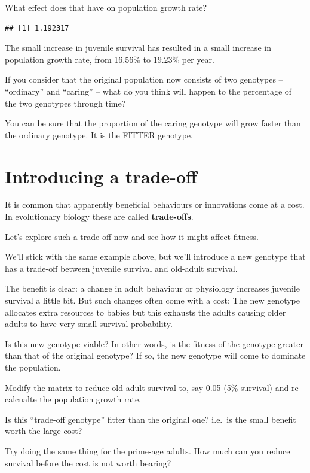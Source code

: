 \documentclass[
  a4paper]{book}
\newenvironment{Shaded}{\begin{snugshade}}{\end{snugshade}}
\newcommand{\FunctionTok}[1]{\textcolor[rgb]{0.00,0.00,0.00}{#1}}
\newcommand{\NormalTok}[1]{#1}
\newcommand{\SpecialCharTok}[1]{\textcolor[rgb]{0.00,0.00,0.00}{#1}}
\begin{document}
What effect does that have on population growth rate?

\begin{Shaded}
\end{Shaded}

\begin{verbatim}
## [1] 1.192317
\end{verbatim}

The small increase in juvenile survival has resulted in a small increase
in population growth rate, from 16.56\% to 19.23\% per year.

If you consider that the original population now consists of two
genotypes -- ``ordinary'' and ``caring'' -- what do you think will
happen to the percentage of the two genotypes through time?

You can be sure that the proportion of the caring genotype will grow
faster than the ordinary genotype. It is the FITTER genotype.

\hypertarget{introducing-a-trade-off}{%
\section{Introducing a trade-off}\label{introducing-a-trade-off}}

It is common that apparently beneficial behaviours or innovations come
at a cost. In evolutionary biology these are called \textbf{trade-offs}.

Let's explore such a trade-off now and see how it might affect fitness.

We'll stick with the same example above, but we'll introduce a new
genotype that has a trade-off between juvenile survival and old-adult
survival.

The benefit is clear: a change in adult behaviour or physiology
increases juvenile survival a little bit. But such changes often come
with a cost: The new genotype allocates extra resources to babies but
this exhausts the adults causing older adults to have very small
survival probability.

Is this new genotype viable? In other words, is the fitness of the
genotype greater than that of the original genotype? If so, the new
genotype will come to dominate the population.

\begin{do-something}
Modify the matrix to reduce old adult survival to, say 0.05 (5\%
survival) and re-calcualte the population growth rate.

Is this ``trade-off genotype'' fitter than the original one? i.e.~is the
small benefit worth the large cost?

Try doing the same thing for the prime-age adults. How much can you
reduce survival before the cost is not worth bearing?
\end{do-something}
\end{document}

